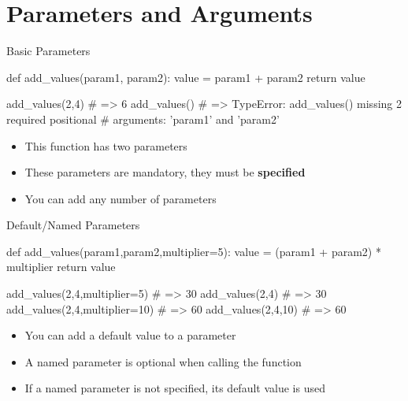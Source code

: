 \documentclass[serif, aspectratio=169]{beamer}
\begin{document}
\section{Parameters and Arguments}

\begin{frame}[fragile]{Basic Parameters}
    \begin{pythoncode}
    def add_values(param1, param2):
        value = param1 + param2
        return value

    add_values(2,4) # => 6
    add_values()
    # => TypeError: add_values() missing 2 required positional 
    #               arguments: 'param1' and 'param2'
    \end{pythoncode}
    \begin{block}{}
        \begin{itemize}
            \item This function has two parameters
            \item These parameters are mandatory, they must be \textbf{specified}
            \item You can add any number of parameters
        \end{itemize}
    \end{block}
\end{frame}

\begin{frame}[fragile]{Default/Named Parameters}
    \begin{pythoncode}
    def add_values(param1,param2,multiplier=5):
        value = (param1 + param2) * multiplier
        return value

    add_values(2,4,multiplier=5)    # => 30
    add_values(2,4)                 # => 30
    add_values(2,4,multiplier=10)   # => 60
    add_values(2,4,10)              # => 60
    \end{pythoncode}
    \begin{block}{}
        \begin{itemize}
            \item You can add a default value to a parameter
            \item A named parameter is optional when calling the function
            \item If a named parameter is not specified, its default value is used
        \end{itemize}
    \end{block}
\end{frame}
\end{document}
